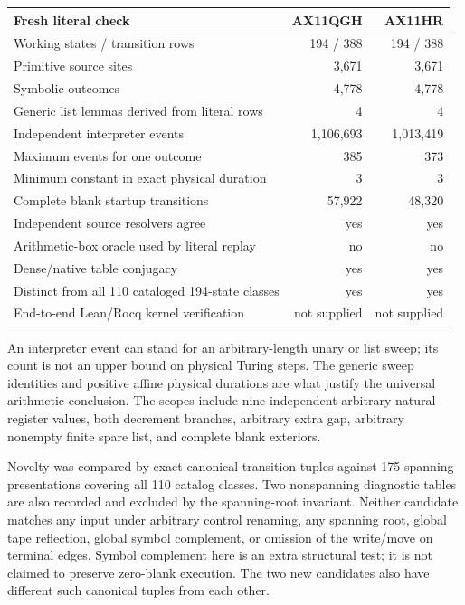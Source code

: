 \begin{center}
\begin{tabular}{@{}lrr@{}}
\toprule
Fresh literal check & AX11QGH & AX11HR\\\midrule
Working states / transition rows &194 / 388&194 / 388\\
Primitive source sites &3,671&3,671\\
Symbolic outcomes &4,778&4,778\\
Generic list lemmas derived from literal rows &4&4\\
Independent interpreter events &1,106,693&1,013,419\\
Maximum events for one outcome &385&373\\
Minimum constant in exact physical duration &3&3\\
Complete blank startup transitions &57,922&48,320\\
Independent source resolvers agree &yes&yes\\
Arithmetic-box oracle used by literal replay &no&no\\
Dense/native table conjugacy &yes&yes\\
Distinct from all 110 cataloged 194-state classes &yes&yes\\
End-to-end Lean/Rocq kernel verification &not supplied&not supplied\\
\bottomrule
\end{tabular}
\end{center}
An interpreter event can stand for an arbitrary-length unary or list sweep;
its count is not an upper bound on physical Turing steps. The generic sweep
identities and positive affine physical durations are what justify the
universal arithmetic conclusion. The scopes include nine independent
arbitrary natural register values, both decrement branches, arbitrary
extra gap, arbitrary nonempty finite spare list, and complete blank
exteriors.

Novelty was compared by exact canonical transition tuples against 175
spanning presentations covering all 110 catalog classes. Two nonspanning
diagnostic tables are also recorded and excluded by the spanning-root
invariant. Neither candidate matches any input under arbitrary control
renaming, any spanning root, global tape reflection, global symbol
complement, or omission of the write/move on terminal edges. Symbol
complement here is an extra structural test; it is not claimed to preserve
zero-blank execution. The two new candidates also have different such
canonical tuples from each other.
